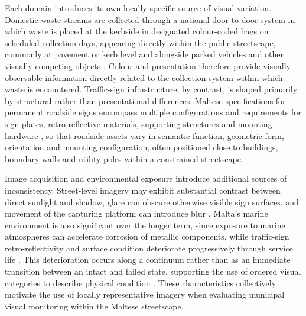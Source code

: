 Each domain introduces its own locally specific source of visual variation. Domestic waste streams are collected through a national door-to-door system in which waste is placed at the kerbside in designated colour-coded bags on scheduled collection days, appearing directly within the public streetscape, commonly at pavement or kerb level and alongside parked vehicles and other visually competing objects \cite{wastecollection2026web,era2023web,BG15-mdwd}. Colour and presentation therefore provide visually observable information directly related to the collection system within which waste is encountered. Traffic-sign infrastructure, by contrast, is shaped primarily by structural rather than presentational differences. Maltese specifications for permanent roadside signs encompass multiple configurations and requirements for sign plates, retro-reflective materials, supporting structures and mounting hardware \cite{infrastructuremalta2020spec}, so that roadside assets vary in semantic function, geometric form, orientation and mounting configuration, often positioned close to buildings, boundary walls and utility poles within a constrained streetscape.

Image acquisition and environmental exposure introduce additional sources of inconsistency. Street-level imagery may exhibit substantial contrast between direct sunlight and shadow, glare can obscure otherwise visible sign surfaces, and movement of the capturing platform can introduce blur \cite{BG15-mdwd,BG20-sign-glare}. Malta's marine environment is also significant over the longer term, since exposure to marine atmospheres can accelerate corrosion of metallic components, while traffic-sign retro-reflectivity and surface condition deteriorate progressively through service life \cite{BG21-marine-corrosion,BG14-sign-degradation}. This deterioration occurs along a continuum rather than as an immediate transition between an intact and failed state, supporting the use of ordered visual categories to describe physical condition \cite{BG22-sign-condition}. These characteristics collectively motivate the use of locally representative imagery when evaluating municipal visual monitoring within the Maltese streetscape.

\newpage
